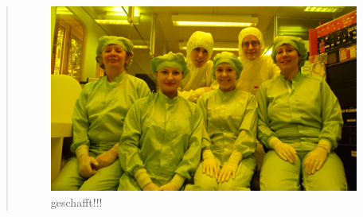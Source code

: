 \begin{quote}
    		\vspace{2em}

    		\begin{figure}[H]
				\hspace{1.5 cm}
                  \includegraphics[scale=1, trim = 0cm 0cm 0cm 0cm,clip]
                	{./HerstellungBilder/Endbild.png}
                  \caption{geschafft!!!}
                \label{fig:geschafft}
            \end{figure}

    		\vspace{2em}




\end{quote}

% 
% 
% 
% 
% 
% 


